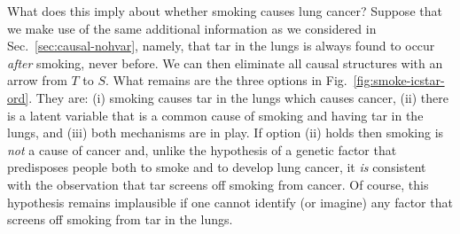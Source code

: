 \documentclass[letterpaper,onecolumn,nofootinbib]{revtex4}
\begin{document}
What does this imply about whether smoking causes lung cancer?  Suppose that we make use of the same additional information as we considered in Sec.~\ref{sec:causal-nohvar}, namely, that tar in the lungs is always found to occur \emph{after} smoking, never before.  We can then eliminate all causal structures with an arrow from $T$ to $S$.  What remains are the three options in Fig.~\ref{fig:smoke-icstar-ord}.  They are: (i) smoking causes tar in the lungs which causes cancer, (ii) there is a latent variable that is a common cause of smoking and having tar in the lungs, and (iii) both mechanisms are in play.  If option (ii) holds then smoking is \emph{not} a cause of cancer and, unlike the hypothesis of a genetic factor that predisposes people both to smoke and to develop lung cancer, it \emph{is} consistent with the observation that tar screens off smoking from cancer.  Of course, this hypothesis remains implausible if one cannot identify (or imagine) any factor that screens off smoking from tar in the lungs.
\end{document}
